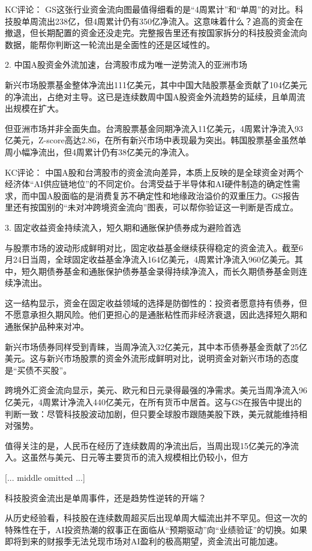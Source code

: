 \documentclass[11pt]{ctexart}
\begin{document}
KC评论： GS这张行业资金流向图最值得细看的是“4周累计”和“单周”的对比。科技股单周流出238亿，但4周累计仍有350亿净流入。这意味着什么？追高的资金在撤退，但长期配置的资金还没走完。完整报告里还有按国家拆分的科技股资金流向数据，能帮你判断这一轮流出是全面性的还是区域性的。

2. 中国A股资金外流加速，台湾股市成为唯一逆势流入的亚洲市场

新兴市场股票基金整体净流出111亿美元，其中中国大陆股票基金贡献了104亿美元的净流出，占绝对主导。这已是连续数周中国A股资金外流趋势的延续，且单周流出规模在扩大。

但亚洲市场并非全面失血。台湾股票基金同期净流入11亿美元，4周累计净流入93亿美元，Z-score高达2.86，在所有新兴市场中表现最为突出。韩国股票基金虽然单周小幅净流出，但4周累计仍有38亿美元的净流入。

KC评论： 中国A股和台湾股市的资金流向差异，本质上反映的是全球资金对两个经济体“AI供应链地位”的不同定价。台湾受益于半导体和AI硬件制造的确定性需求，而中国A股面临的是消费复苏不确定性和地缘政治溢价的双重压力。GS报告里还有按国别的“未对冲跨境资金流向”图表，可以帮你验证这一判断是否成立。

3. 固定收益资金持续流入，短久期和通胀保护债券成为避险首选

与股票市场的波动形成鲜明对比，固定收益基金继续获得稳定的资金流入。截至6月24日当周，全球固定收益基金净流入164亿美元，4周累计净流入960亿美元。其中，短久期债券基金和通胀保护债券基金录得持续净流入，而长久期债券基金则连续净流出。

这一结构显示，资金在固定收益领域的选择是防御性的：投资者愿意持有债券，但不愿意承担久期风险。他们更担心的是通胀粘性而非经济衰退，因此选择短久期和通胀保护品种来对冲。

新兴市场债券同样受到青睐，当周净流入32亿美元，其中本币债券基金贡献了25亿美元。这与新兴市场股票的资金外流形成鲜明对比，说明资金对新兴市场的态度是“买债不买股”。

跨境外汇资金流向显示，美元、欧元和日元录得最强的净需求。美元当周净流入96亿美元，4周累计净流入440亿美元，在所有货币中居首。这与GS在报告中提出的判断一致：尽管科技股波动加剧，但只要全球股市跟随美股下跌，美元就能维持相对强势。

值得关注的是，人民币在经历了连续数周的净流出后，当周出现15亿美元的净流入。这虽然与美元、日元等主要货币的流入规模相比仍较小，但方

[... middle omitted ...]

科技股资金流出是单周事件，还是趋势性逆转的开端？

从历史经验看，科技股在连续数周超买后出现单周大幅流出并不罕见。但这一次的特殊性在于，AI投资热潮的叙事正在面临从“预期驱动”向“业绩验证”的切换。如果即将到来的财报季无法兑现市场对AI盈利的极高期望，资金流出可能加速。
\end{document}
